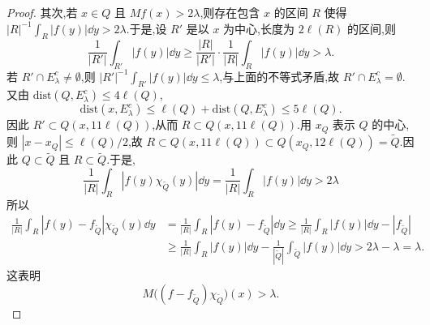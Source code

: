 \begin{proof}
其次,若 $x \in Q$ 且 $Mf(x) > 2\lambda$,则存在包含 $x$ 的区间 $R$ 使得 $|R|^{-1}\int_{R}|f(y)|\dd y > 2\lambda$.于是,设 $R'$ 是以 $x$ 为中心,长度为 $2\ell(R)$ 的区间,则
\begin{equation*}
\frac{1}{|R'|}\int_{R'}|f(y)|\dd y \geq \frac{|R|}{|R'|}\cdot\frac{1}{|R|}\int_{R}|f(y)|\dd y > \lambda.
\end{equation*}
若 $R' \cap E_{\lambda}^{c} \neq \emptyset$,则 $|R'|^{-1}\int_{R'}|f(y)|\dd y \leq \lambda$,与上面的不等式矛盾,故 $R' \cap E_{\lambda}^{c} = \emptyset$.又由 $\mathrm{dist}(Q, E_{\lambda}^{c}) \leq 4\ell(Q)$,
\begin{equation*}
\mathrm{dist}(x, E_{\lambda}^{c}) \leq \ell(Q) + \mathrm{dist}(Q, E_{\lambda}^{c}) \leq 5\ell(Q).
\end{equation*}
因此 $R' \subset Q(x, 11\ell(Q))$,从而 $R \subset Q(x, 11\ell(Q))$.用 $x_{Q}$ 表示 $Q$ 的中心,则 $|x - x_{Q}| \leq \ell(Q)/2$,故 $R \subset Q(x, 11\ell(Q)) \subset Q(x_{Q}, 12\ell(Q)) = \tilde{Q}$.因此 $Q \subset \tilde{Q}$ 且 $R \subset \tilde{Q}$.于是,
\begin{equation*}
\frac{1}{|R|}\int_{R}|f(y)\chi_{\tilde{Q}}(y)|\dd y = \frac{1}{|R|}\int_{R}|f(y)|\dd y > 2\lambda
\end{equation*}
所以
\begin{align*}
\frac{1}{|R|}\int_{R}|f(y) - f_{\tilde{Q}}|\chi_{\tilde{Q}}(y)\dd y&= \frac{1}{|R|}\int_{R}|f(y) - f_{\tilde{Q}}|\dd y \geq \frac{1}{|R|}\int_{R}|f(y)|\dd y - |f_{\tilde{Q}}|  \\
\qquad &\geq \frac{1}{|R|}\int_{R}|f(y)|\dd y - \frac{1}{|\tilde{Q}|}\int_{\tilde{Q}}|f(y)|\dd y > 2\lambda - \lambda = \lambda.
\end{align*}
这表明
\begin{equation*}
M\bigl((f - f_{\tilde{Q}})\chi_{\tilde{Q}}\bigr)(x) > \lambda.
\end{equation*}


\end{proof}

